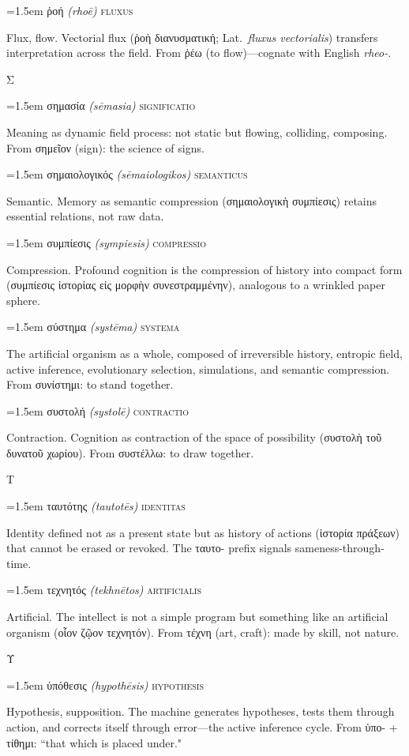 \documentclass[12pt, oneside, openany]{memoir}
\newcommand{\gk}[1]{\textgreek{#1}}
\newcommand{\gkblue}[1]{{\color{greekblue}\textgreek{#1}}}
\newcommand{\gentry}[4]{%
  \noindent\hangindent=1.5em
  {\gkblue{#1}}\enspace
  {\itshape(#2)}\enspace
  {\color{rubricate}\textperiodcentered}\enspace
  {\scshape #3}\par
  \hspace*{1.5em}%
  \parbox[t]{\dimexpr\linewidth-1.5em\relax}{\strut#4\strut}%
  \par\addvspace{6pt}}
\begin{document}
\gentry{ῥοή}{rho\={e}}{fluxus}
{Flux, flow. Vectorial flux (\gk{ῥοὴ διανυσματική}; Lat.\ \textit{fluxus vectorialis}) transfers interpretation across the field. From \gk{ῥέω} (to flow)---cognate with English \textit{rheo-}.}

\bigskip
{\centering\color{rubricate}\large\scshape Σ \par}\medskip

\gentry{σημασία}{s\={e}masia}{significatio}
{Meaning as dynamic field process: not static but flowing, colliding, composing. From \gk{σημεῖον} (sign): the science of signs.}

\gentry{σημαιολογικός}{s\={e}maiologikos}{semanticus}
{Semantic. Memory as semantic compression (\gk{σημαιολογικὴ συμπίεσις}) retains essential relations, not raw data.}

\gentry{συμπίεσις}{sympiesis}{compressio}
{Compression. Profound cognition is the compression of history into compact form (\gk{συμπίεσις ἱστορίας εἰς μορφὴν συνεστραμμένην}), analogous to a wrinkled paper sphere.}

\gentry{σύστημα}{syst\={e}ma}{systema}
{The artificial organism as a whole, composed of irreversible history, entropic field, active inference, evolutionary selection, simulations, and semantic compression. From \gk{συνίστημι}: to stand together.}

\gentry{συστολή}{systol\={e}}{contractio}
{Contraction. Cognition as contraction of the space of possibility (\gk{συστολὴ τοῦ δυνατοῦ χωρίου}). From \gk{συστέλλω}: to draw together.}

\bigskip
{\centering\color{rubricate}\large\scshape Τ \par}\medskip

\gentry{ταυτότης}{tautot\={e}s}{identitas}
{Identity defined not as a present state but as history of actions (\gk{ἱστορία πράξεων}) that cannot be erased or revoked. The \gk{ταυτο-} prefix signals sameness-through-time.}

\gentry{τεχνητός}{tekhn\={e}tos}{artificialis}
{Artificial. The intellect is not a simple program but something like an artificial organism (\gk{οἷον ζῷον τεχνητόν}). From \gk{τέχνη} (art, craft): made by skill, not nature.}

\bigskip
{\centering\color{rubricate}\large\scshape Υ \par}\medskip

\gentry{ὑπόθεσις}{hypoth\={e}sis}{hypothesis}
{Hypothesis, supposition. The machine generates hypotheses, tests them through action, and corrects itself through error---the active inference cycle. From \gk{ὑπο-} + \gk{τίθημι}: ``that which is placed under."}
\end{document}
